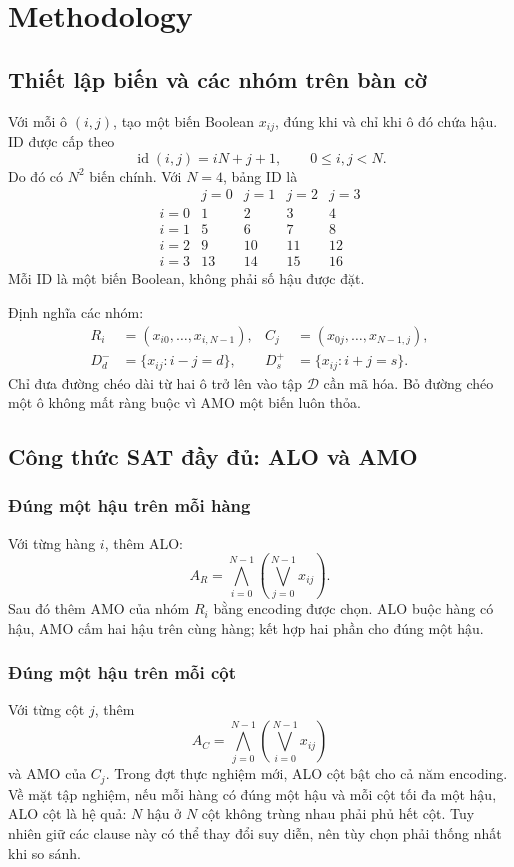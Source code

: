\section{Methodology}
\label{sec:methodology}
\subsection{Thiết lập biến và các nhóm trên bàn cờ}
Với mỗi ô $(i,j)$, tạo một biến Boolean $x_{ij}$, đúng khi và chỉ khi ô đó chứa hậu. ID được cấp theo
\begin{equation}
\operatorname{id}(i,j)=iN+j+1,\qquad 0\le i,j<N.
\label{eq:id}
\end{equation}
Do đó có $N^2$ biến chính. Với $N=4$, bảng ID là
\[
\begin{array}{c|rrrr}
 & j=0&j=1&j=2&j=3\\\hline
i=0&1&2&3&4\\
i=1&5&6&7&8\\
i=2&9&10&11&12\\
i=3&13&14&15&16
\end{array}
\]
Mỗi ID là một biến Boolean, không phải số hậu được đặt.

Định nghĩa các nhóm:
\begin{align}
R_i&=(x_{i0},\ldots,x_{i,N-1}),&
C_j&=(x_{0j},\ldots,x_{N-1,j}),\\
D^-_d&=\{x_{ij}:i-j=d\},&
D^+_s&=\{x_{ij}:i+j=s\}.
\end{align}
Chỉ đưa đường chéo dài từ hai ô trở lên vào tập $\mathcal D$ cần mã hóa. Bỏ đường chéo một ô không mất ràng buộc vì AMO một biến luôn thỏa.

\subsection{Công thức SAT đầy đủ: ALO và AMO}
\subsubsection{Đúng một hậu trên mỗi hàng}
Với từng hàng $i$, thêm ALO:
\begin{equation}
A_R=\bigwedge_{i=0}^{N-1}\left(\bigvee_{j=0}^{N-1}x_{ij}\right).
\label{eq:alo-row}
\end{equation}
Sau đó thêm AMO của nhóm $R_i$ bằng encoding được chọn. ALO buộc hàng có hậu, AMO cấm hai hậu trên cùng hàng; kết hợp hai phần cho đúng một hậu.

\subsubsection{Đúng một hậu trên mỗi cột}
Với từng cột $j$, thêm
\begin{equation}
A_C=\bigwedge_{j=0}^{N-1}\left(\bigvee_{i=0}^{N-1}x_{ij}\right)
\label{eq:alo-col}
\end{equation}
và AMO của $C_j$. Trong đợt thực nghiệm mới, ALO cột bật cho cả năm encoding. Về mặt tập nghiệm, nếu mỗi hàng có đúng một hậu và mỗi cột tối đa một hậu, ALO cột là hệ quả: $N$ hậu ở $N$ cột không trùng nhau phải phủ hết cột. Tuy nhiên giữ các clause này có thể thay đổi suy diễn, nên tùy chọn phải thống nhất khi so sánh.

